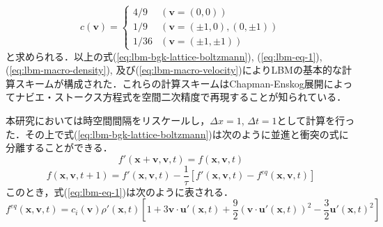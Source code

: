 \begin{equation}
  c(\bm{v}) = \left\{
    \begin{array}{ll}
      4/9 & (\bm{v} = (0, 0)) \\
      1/9 & (\bm{v} = (\pm 1, 0), (0, \pm 1)) \\
      1/36 & (\bm{v} = (\pm 1, \pm 1))
    \end{array}
  \right.
  \label{eq:lbm-weight}
\end{equation}
と求められる．以上の式(\ref{eq:lbm-bgk-lattice-boltzmann}), (\ref{eq:lbm-eq-1}), (\ref{eq:lbm-macro-density}), 及び(\ref{eq:lbm-macro-velocity})によりLBMの基本的な計算スキームが構成された．これらの計算スキームはChapman-Enskog展開によってナビエ・ストークス方程式を空間二次精度で再現することが知られている\cite{Inamuro2020}．

本研究においては時空間間隔をリスケールし，$\Delta x = 1$, $\Delta t = 1$として計算を行った．その上で式(\ref{eq:lbm-bgk-lattice-boltzmann})は次のように並進と衝突の式に分離することができる．
\begin{equation}
  f'(\bm{x}+\bm{v}, \bm{v}, t)
  = f(\bm{x}, \bm{v}, t)
  \label{eq:lbm-streaming}
\end{equation}
\begin{equation}
  f(\bm{x}, \bm{v}, t+1)
  = f'(\bm{x}, \bm{v}, t) - \frac{1}{\tau} \left[ f'(\bm{x}, \bm{v}, t) - f^{eq}(\bm{x}, \bm{v}, t) \right]
  \label{eq:lbm-collision}
\end{equation}
このとき，式(\ref{eq:lbm-eq-1})は次のように表される．
\begin{equation}
  f^{eq}(\bm{x}, \bm{v}, t) = c_i(\bm{v}) \rho'(\bm{x}, t) \left[ 1 + 3\bm{v} \cdot \bm{u}'(\bm{x}, t) + \frac{9}{2}(\bm{v} \cdot \bm{u}'(\bm{x}, t))^2 - \frac{3}{2}\bm{u}'(\bm{x}, t)^2 \right]
  \label{eq:lbm-eq}
\end{equation}

